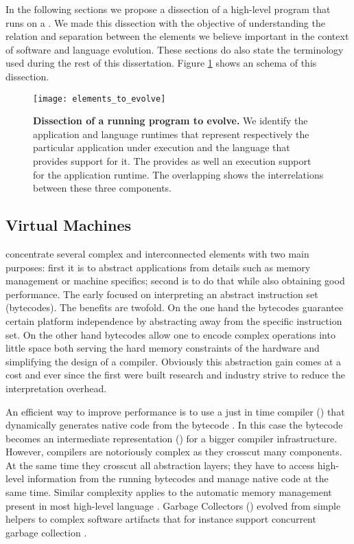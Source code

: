 In the following sections we propose a dissection of a high-level program that runs on a \VM. We made this dissection with the objective of understanding the relation and separation between the elements we believe important in the context of software and language evolution. These sections do also state the terminology used during the rest of this dissertation. Figure \ref{fig:whatToEvolve} shows an schema of this dissection.

\begin{figure}[!ht]
\begin{center}
\texttt{[image: elements\_to\_evolve]}
\caption{\textbf{Dissection of a running program to evolve.}\label{fig:whatToEvolve} We identify the application and language runtimes that represent respectively the particular application under execution and the language that provides support for it. The \VM provides as well an execution support for the application runtime. The overlapping shows the interrelations between these three components.}
\end{center}
\end{figure}



\subsection{Virtual Machines}

\VMs concentrate several complex and interconnected elements with two main purposes: first it is to abstract applications from details such as memory management or machine specifics; second is to do that while also obtaining good performance.
The early \VMs focused on interpreting an abstract instruction set (bytecodes).
The benefits are twofold.
On the one hand the bytecodes guarantee certain platform independence by abstracting away from the \CPU specific instruction set.
On the other hand bytecodes allow one to encode complex operations into little space both serving the hard memory constraints of the hardware and simplifying the design of a compiler.
Obviously this abstraction gain comes at a cost and ever since the first \VMs were built research and industry strive to reduce the interpretation overhead.

An efficient way to improve performance is to use a just in time compiler (\JIT) that dynamically generates native code from the bytecode \cite{Deut84a}.
In this case the bytecode becomes an intermediate representation (\IR) for a bigger compiler infrastructure.
However, \JIT compilers are notoriously complex as they crosscut many \VM components.
At the same time they crosscut all abstraction layers; they have to access high-level information from the running bytecodes and manage native code at the same time.
Similar complexity applies to the automatic memory management present in most high-level language \VMs.
Garbage Collectors (\GC) evolved from simple helpers to complex software artifacts that for instance support concurrent garbage collection \cite{Clic05a}.

